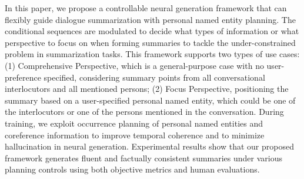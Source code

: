 In this paper, we propose a controllable neural generation framework that can flexibly guide dialogue summarization with personal named entity planning. The conditional sequences are modulated to decide what types of information or what perspective to focus on when forming summaries to tackle the under-constrained problem in summarization tasks. This framework supports two types of use cases: (1) Comprehensive Perspective, which is a general-purpose case with no user-preference specified, considering summary points from all conversational interlocutors and all mentioned persons; (2) Focus Perspective, positioning the summary based on a user-specified personal named entity, which could be one of the interlocutors or one of the persons mentioned in the conversation. During training, we exploit occurrence planning of personal named entities and coreference information to improve temporal coherence and to minimize hallucination in neural generation. Experimental results show that our proposed framework generates fluent and factually consistent summaries under various planning controls using both objective metrics and human evaluations.
